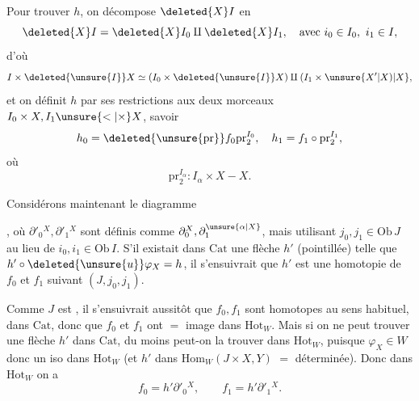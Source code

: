 Pour trouver $h$, on décompose $\deleted{X}I$ en
\[
 \deleted{X}I=\deleted{X}I_0\amalg\deleted{X}I_1,\quad\text{avec } i_0\in I_0,\ i_1\in I,
\]
d'où
\[
 I\times \deleted{\unsure{I}}X\simeq(I_0\times \deleted{\unsure{I}}X)\amalg(I_1\times\unsure{X'|X)|X},
\]
et on définit $h$ par ses restrictions  aux deux morceaux $I_0\times X,I_1\unsure{<|\times}X$, savoir
\[
 h_0=\deleted{\unsure{\mathrm{pr}}}f_0\mathrm{pr}_2^{I_0},\quad
 h_1=f_1\circ\mathrm{pr}_2^{I_1},
\]
où
\[
 \mathrm{pr}_2^{I_\alpha}:I_\alpha\times X-X.
\]

Considérons maintenant le diagramme 


, où $\partial'_0{}^X,\partial'_1{}^X$ sont définis comme $\partial_0^X,\partial_1^{\unsure{\alpha|X}}$, mais utilisant $j_0,j_1\in\mathrm{Ob}\,J$ au lieu de $i_0,i_1\in\mathrm{Ob}\,I$. S'il existait dans $\mathrm{Cat}$ une flèche $h'$ (pointillée) telle que $h'\circ\deleted{\unsure{u}}\varphi_X=h$, il s'ensuivrait que  $h'$ est une homotopie de $f_0$ et $f_1$ suivant $(J,j_0,j_1)$.

Comme $J$ est , il s'ensuivrait aussitôt que $f_0,f_1$ sont homotopes au sens habituel, dans $\mathrm{Cat}$, donc  que $f_0$ et $f_1$ ont $=$ image dans $\mathrm{Hot}_W$. Mais si on ne peut trouver une flèche $h'$ dans $\mathrm{Cat}$, du moins peut-on la trouver dans $\mathrm{Hot}_W$, puisque $\varphi_X\in W$ donc un iso dans $\mathrm{Hot}_W$ (et $h'$ dans $\mathrm{Hom}_W(J\times X,Y)$  $=$  déterminée). Donc dans $\mathrm{Hot}_W$ on a 
\[
 f_0=h'\partial'_0{}^X,\qquad f_1=h'\partial'_1{}^X.
\]

